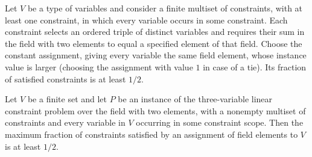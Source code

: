 \begin{theorem}
\label{FABL.betterE3LinConstantAssignment_value_ge_half}
\leanok
{}
Let $V$ be a type of variables and consider a finite multiset of constraints, with at
least one constraint, in which every variable occurs in some constraint. Each constraint
selects an ordered triple of distinct variables and requires their sum in the field with
two elements to equal a specified element of that field. Choose the constant assignment,
giving every variable the same field element, whose instance value is larger (choosing
the assignment with value $1$ in case of a tie). Its fraction of satisfied constraints
is at least $1/2$.
\end{theorem}

\begin{theorem}
\label{FABL.half_le_optimum_maxE3Lin}
\leanok
{}
Let $V$ be a finite set and let $P$ be an instance of the three-variable linear
constraint problem over the field with two elements, with a nonempty multiset of
constraints and every variable in $V$ occurring in some constraint scope. Then the
maximum fraction of constraints satisfied by an assignment of field elements to $V$ is
at least $1/2$.
\end{theorem}

